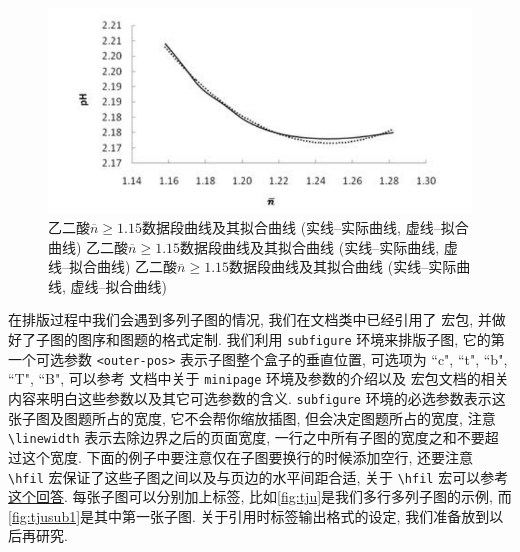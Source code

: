 \begin{figure}[htbp]
  \centering
  \includegraphics{figures/oxalic-acid-n-geq-1.15.pdf}
  \caption{乙二酸$\overline{n}\geq 1.15$数据段曲线及其拟合曲线 (实线--实际曲线, 虚线--拟合曲线) 乙二酸$\overline{n}\geq 1.15$数据段曲线及其拟合曲线 (实线--实际曲线, 虚线--拟合曲线) 乙二酸$\overline{n}\geq 1.15$数据段曲线及其拟合曲线 (实线--实际曲线, 虚线--拟合曲线)}\label{fig:xlccd-single}
\end{figure}

在排版过程中我们会遇到多列子图的情况, 我们在文档类中已经引用了  宏包, 并做好了子图的图序和图题的格式定制. 我们利用 \verb|subfigure| 环境来排版子图, 它的第一个可选参数 \verb|<outer-pos>| 表示子图整个盒子的垂直位置, 可选项为 ``c", ``t", ``b", ``T", ``B", 可以参考  文档中关于 \verb|minipage| 环境及参数的介绍以及  宏包文档的相关内容来明白这些参数以及其它可选参数的含义. \verb|subfigure| 环境的必选参数表示这张子图及图题所占的宽度, 它不会帮你缩放插图, 但会决定图题所占的宽度, 注意\verb|\linewidth| 表示去除边界之后的页面宽度, 一行之中所有子图的宽度之和不要超过这个宽度. 下面的例子中要注意仅在子图要换行的时候添加空行, 还要注意 \verb|\hfil| 宏保证了这些子图之间以及与页边的水平间距合适, 关于 \verb|\hfil| 宏可以参考\href{https://tex.stackexchange.com/a/528921/184559}{这个回答}. 每张子图可以分别加上标签, 比如\ref{fig:tju}是我们多行多列子图的示例, 而\ref{fig:tjusub1}是其中第一张子图. 关于引用时标签输出格式的设定, 我们准备放到以后再研究.

